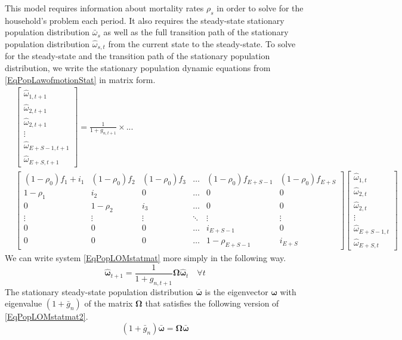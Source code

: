 \documentclass[letterpaper,12pt]{article}
\theoremstyle{definition}
\begin{document}
    This model requires information about mortality rates $\rho_s$ in order to solve for the household's problem each period. It also requires the steady-state stationary population distribution $\bar{\omega}_{s}$ as well as the full transition path of the stationary population distribution $\hat{\omega}_{s,t}$ from the current state to the steady-state. To solve for the steady-state and the transition path of the stationary population distribution, we write the stationary population dynamic equations from \eqref{EqPopLawofmotionStat} in matrix form.
    \begin{equation}\label{EqPopLOMstatmat}
      \begin{split}
        & \begin{bmatrix}
          \hat{\omega}_{1,t+1} \\ \hat{\omega}_{2,t+1} \\ \hat{\omega}_{2,t+1} \\ \vdots \\ \hat{\omega}_{E+S-1,t+1} \\ \hat{\omega}_{E+S,t+1}
        \end{bmatrix}= \frac{1}{1 + g_{n,t+1}} \times ... \\
        & \begin{bmatrix}
          (1-\rho_0)f_1+i_1 & (1-\rho_0)f_2 & (1-\rho_0)f_3 & \hdots & (1-\rho_0)f_{E+S-1} & (1-\rho_0)f_{E+S} \\
          1-\rho_1 & i_2 & 0 & \hdots & 0 & 0 \\
          0 & 1-\rho_2 & i_3 & \hdots & 0 & 0 \\
          \vdots & \vdots & \vdots & \ddots & \vdots & \vdots \\
          0 & 0 & 0 & \hdots & i_{E+S-1} & 0 \\
          0 & 0 & 0 & \hdots & 1-\rho_{E+S-1} & i_{E+S}
        \end{bmatrix}
        \begin{bmatrix}
          \hat{\omega}_{1,t} \\ \hat{\omega}_{2,t} \\ \hat{\omega}_{2,t} \\ \vdots \\ \hat{\omega}_{E+S-1,t} \\ \hat{\omega}_{E+S,t}
        \end{bmatrix}
      \end{split}
    \end{equation}
    We can write system \eqref{EqPopLOMstatmat} more simply in the following way.
    \begin{equation}\label{EqPopLOMstatmat2}
      \bm{\hat{\omega}}_{t+1} = \frac{1}{1+g_{n,t+1}}\bm{\Omega}\bm{\hat{\omega}}_t \quad\forall t
    \end{equation}
    The stationary steady-state population distribution $\bm{\bar{\omega}}$ is the eigenvector $\bm{\omega}$ with eigenvalue $(1+\bar{g}_n)$ of the matrix $\bm{\Omega}$ that satisfies the following version of \eqref{EqPopLOMstatmat2}.
    \begin{equation}\label{EqPopLOMss}
      (1+\bar{g}_n)\bm{\bar{\omega}} = \bm{\Omega}\bm{\bar{\omega}}
    \end{equation}
\end{document}
